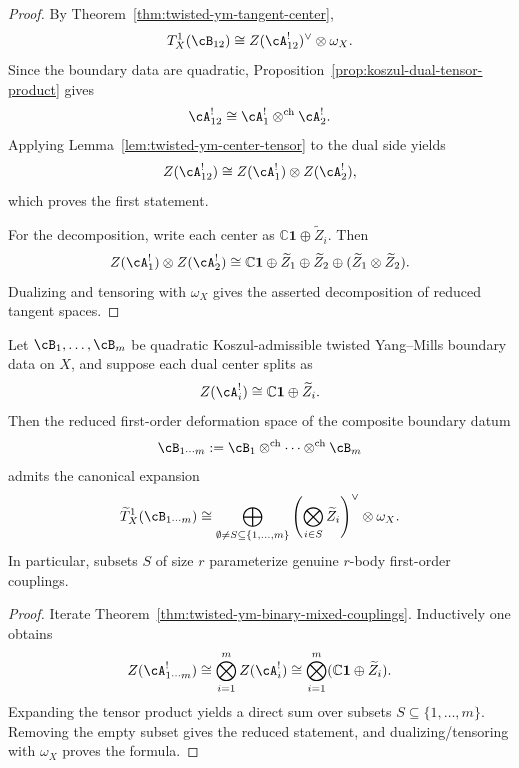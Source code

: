 \begin{proof}
By Theorem~\ref{thm:twisted-ym-tangent-center},
\[
T^1_X(\cB_{12})
\cong
Z(\cA_{12}^{!})^{\vee}\otimes \omega_X.
\]
Since the boundary data are quadratic, Proposition~\ref{prop:koszul-dual-tensor-product} gives
\[
\cA_{12}^{!}
\cong
\cA_1^{!}\otimes^{\mathrm{ch}}\cA_2^{!}.
\]
Applying Lemma~\ref{lem:twisted-ym-center-tensor} to the dual side yields
\[
Z(\cA_{12}^{!})
\cong
Z(\cA_1^{!})\otimes Z(\cA_2^{!}),
\]
which proves the first statement.

For the decomposition, write each center as $\mathbb{C}\mathbf{1}\oplus \widetilde Z_i$.  Then
\[
Z(\cA_1^{!})\otimes Z(\cA_2^{!})
\cong
\mathbb{C}\mathbf{1}
\oplus
\widetilde Z_1
\oplus
\widetilde Z_2
\oplus
(\widetilde Z_1\otimes \widetilde Z_2).
\]
Dualizing and tensoring with $\omega_X$ gives the asserted decomposition of reduced tangent spaces.
\end{proof}

\begin{corollary}
\label{cor:twisted-ym-multibody-couplings}
Let $\cB_1,\dots,\cB_m$ be quadratic Koszul-admissible twisted Yang--Mills boundary data on $X$, and suppose each dual center splits as
\[
Z(\cA_i^{!}) \cong \mathbb{C}\mathbf{1}\oplus \widetilde Z_i.
\]
Then the reduced first-order deformation space of the composite boundary datum
\[
\cB_{1\cdots m}
:=
\cB_1\otimes^{\mathrm{ch}}\cdots\otimes^{\mathrm{ch}}\cB_m
\]
admits the canonical expansion
\[
\widetilde T^1_X(\cB_{1\cdots m})
\cong
\bigoplus_{\emptyset \neq S \subseteq \{1,\dots,m\}}
\left(\bigotimes_{i\in S} \widetilde Z_i\right)^{\vee}\otimes \omega_X.
\]
In particular, subsets $S$ of size $r$ parameterize genuine $r$-body first-order couplings.
\end{corollary}

\begin{proof}
Iterate Theorem~\ref{thm:twisted-ym-binary-mixed-couplings}.  Inductively one obtains
\[
Z(\cA_{1\cdots m}^{!})
\cong
\bigotimes_{i=1}^m Z(\cA_i^{!})
\cong
\bigotimes_{i=1}^m (\mathbb{C}\mathbf{1}\oplus \widetilde Z_i).
\]
Expanding the tensor product yields a direct sum over subsets $S\subseteq \{1,\dots,m\}$.  Removing the empty subset gives the reduced statement, and dualizing/tensoring with $\omega_X$ proves the formula.
\end{proof}

